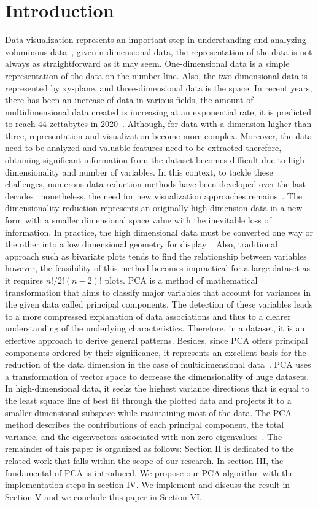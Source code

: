 \documentclass[conference]{IEEEtran}
\begin{document}
\section{Introduction}
Data visualization represents an important step in understanding and analyzing voluminous data~\cite{Lamrini}, given n-dimensional data, the representation of the data is not always as straightforward as it may seem. One-dimensional data is a simple representation of the data on the number line. Also, the two-dimensional data is represented by xy-plane, and three-dimensional data is the space. In recent years, there has been an increase of data in various fields, the amount of multidimensional data created is increasing at an exponential rate, it is predicted to reach 44 zettabytes in 2020~\cite{Genender}. Although, for data with a dimension higher than three, representation and visualization become more complex. Moreover, the data need to be analyzed and valuable features need to be extracted therefore, obtaining significant information from the dataset becomes difficult due to high dimensionality and number of variables. In this context, to tackle these challenges, numerous data reduction methods have been developed over the last decades~\cite{Liu} nonetheless, the need for new visualization approaches remains~\cite{Onana}. The dimensionality reduction represents an originally high dimension data in a new form with a smaller dimensional space value with the inevitable loss of information. In practice, the high dimensional data must be converted one way or the other into a low dimensional geometry for display~\cite{Xu}. Also, traditional approach such as bivariate plots tends to find the relationship between variables however, the feasibility of this method becomes impractical for a large dataset as it requires $n!/2!(n-2)!$ plots.
PCA is a method of mathematical transformation that aims to classify major variables that account for variances in the given data called principal components. The detection of these variables leads to a more compressed explanation of data associations and thus to a clearer understanding of the underlying characteristics. Therefore, in a dataset, it is an effective approach to derive general patterns. Besides, since PCA offers principal components ordered by their significance, it represents an excellent basis for the reduction of the data dimension in the case of multidimensional data~\cite{Nocke}. PCA uses a transformation of vector space to decrease the dimensionality of huge datasets. In high-dimensional data, it seeks the highest variance directions that is equal to the least square line of best fit through the plotted data and projects it to a smaller dimensional subspace while maintaining most of the data. The PCA method describes the contributions of each principal component, the total variance, and the eigenvectors associated with non-zero eigenvalues~\cite{Salem}. 
The remainder of this paper is organized as follows: Section II is dedicated to the related work that falls within the scope of our research. In section III, the fundamental of PCA is introduced. We propose our PCA algorithm with the implementation steps in section IV. We implement and discuss the result in Section V and we conclude this paper in Section VI.
\end{document}
